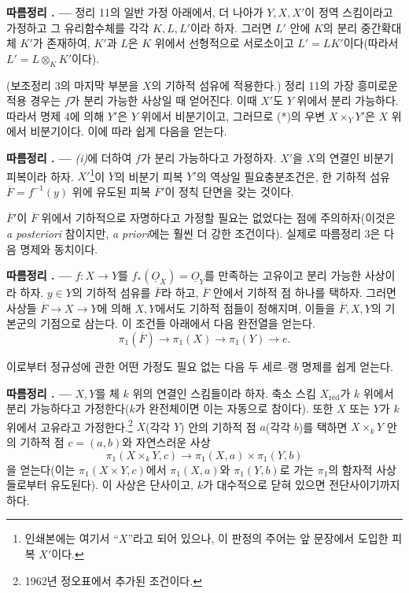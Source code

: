\documentclass[11pt,twoside,openany]{book}
\numberwithin{equation}{section}
\newcommand{\sourceunit}{front}
\newcommand{\src}[1]{%
  \phantomsection\hypertarget{src:\sourceunit:#1}{}%
  \marginpar{\raggedleft\footnotesize\sffamily #1}%
}
\newcommand{\Osh}{\underline{O}}
\theoremstyle{plain}
\theoremstyle{definition}
\theoremstyle{remark}
\newcommand{\result}[2]{%
  \par\medskip\noindent\textbf{#1%
  \if\relax\detokenize{#2}\relax\else\space#2\fi. ---}\enspace
}
\begin{document}
\result{따름정리}{2} 정리 11의 일반 가정 아래에서, 더 나아가
$Y,X,X'$이 정역 스킴이라고 가정하고 그 유리함수체를 각각 $K,L,L'$이라
하자. 그러면 $L'$ 안에 $K$의 분리 중간확대체 $K'$가 존재하여, $K'$과
$L$은 $K$ 위에서 선형적으로 서로소이고 $L'=LK'$이다(따라서
$L'=L\otimes_K K'$이다).

(보조정리 3의 마지막 부분을 $X$의 기하적 섬유에 적용한다.) 정리 11의
가장 흥미로운 적용 경우는 $f$가 분리 가능한 사상일 때 얻어진다. 이때
$X'$도 $Y$ 위에서 분리 가능하다. 따라서 명제 4에 의해 $Y'$은 $Y$ 위에서
비분기이고, 그러므로 (*)의 우변 $X\times_Y Y'$은 $X$ 위에서 비분기이다.
이에 따라 쉽게 다음을 얻는다.

\result{따름정리}{3} \textit{(i)}에 더하여 $f$가 분리 가능하다고 가정하자.
$X'$을 $X$의 연결인 비분기 피복이라 하자. $X'$\footnote{인쇄본에는
여기서 ``$X$''라고 되어 있으나, 이 판정의 주어는 앞 문장에서 도입한
피복 $X'$이다.}이 $Y$의 비분기 피복 $Y'$의 역상일 필요충분조건은, 한
기하적 섬유 $\overline F=f^{-1}(y)$ 위에 유도된 피복 $\overline F'$이
정칙 단면을 갖는 것이다.

$\overline F'$이 $\overline F$ 위에서 기하적으로 자명하다고 가정할 필요는
없었다는 점에 주의하자(이것은 \textit{a posteriori} 참이지만,
\textit{a priori}에는 훨씬 더 강한 조건이다). 실제로 따름정리 3은 다음
명제와 동치이다.

\src{215}
\result{따름정리}{4} $f:X\longrightarrow Y$를
$f_*(\Osh_X)=\Osh_Y$를 만족하는 고유이고 분리 가능한 사상이라 하자.
$y\in Y$의 기하적 섬유를 $\overline F$라 하고, $\overline F$ 안에서
기하적 점 하나를 택하자. 그러면 사상들
$\overline F\longrightarrow X\longrightarrow Y$에 의해 $X,Y$에서도
기하적 점들이 정해지며, 이들을 $\overline F,X,Y$의 기본군의 기점으로
삼는다. 이 조건들 아래에서 다음 완전열을 얻는다.
\[
  \boxed{
    \pi_1(\overline F)\longrightarrow\pi_1(X)
    \longrightarrow\pi_1(Y)\longrightarrow e
  }.
\]

이로부터 정규성에 관한 어떤 가정도 필요 없는 다음 두 세르--랭 명제를
쉽게 얻는다.

\result{따름정리}{5} $X,Y$를 체 $k$ 위의 연결인 스킴들이라 하자. 축소
스킴 $X_{\mathrm{réd}}$가 $k$ 위에서 분리 가능하다고 가정한다($k$가
완전체이면 이는 자동으로 참이다). 또한 $X$ 또는 $Y$가 $k$ 위에서
고유라고 가정한다.\footnote{1962년 정오표에서 추가된 조건이다.} $X$(각각
$Y$) 안의 기하적 점 $a$(각각 $b$)를 택하면 $X\times_kY$ 안의 기하적 점
$c=(a,b)$와 자연스러운 사상
\[
  \pi_1(X\times_kY,c)\longrightarrow
  \pi_1(X,a)\times\pi_1(Y,b)
\]
을 얻는다(이는 $\pi_1(X\times Y,c)$에서 $\pi_1(X,a)$와
$\pi_1(Y,b)$로 가는 $\pi_1$의 함자적 사상들로부터 유도된다). 이 사상은
단사이고, $k$가 대수적으로 닫혀 있으면 전단사이기까지 하다.
\end{document}
